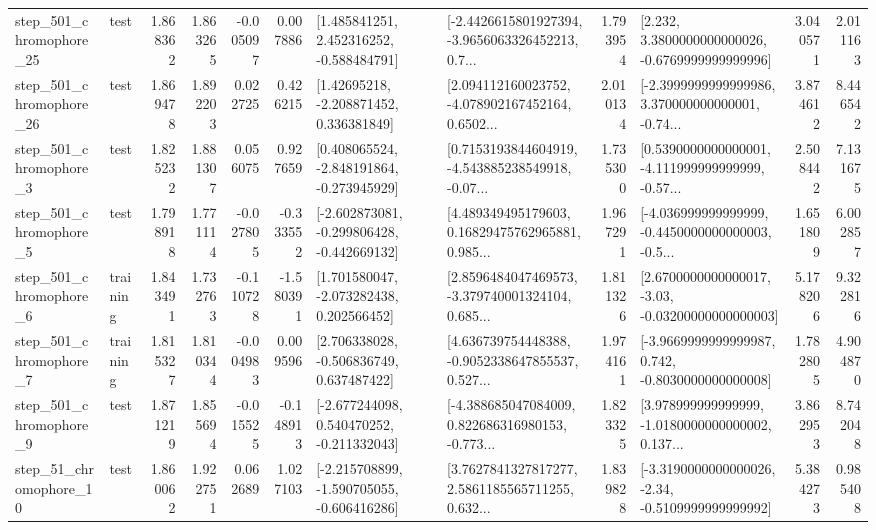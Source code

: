 \begin{tabular}{llrrrrllrlrr}
  step\_501\_chromophore\_25 &      test &      1.868362 &    1.863265 &     -0.005097 &  0.007886 &    [1.485841251, 2.452316252, -0.588484791] &  [-2.4426615801927394, -3.9656063326452213, 0.7... &       1.793954 &   [2.232, 3.3800000000000026, -0.6769999999999996] &            3.040571 &          2.011163 \\
  step\_501\_chromophore\_26 &      test &      1.869478 &    1.892203 &      0.022725 &  0.426215 &     [1.42695218, -2.208871452, 0.336381849] &  [2.094112160023752, -4.078902167452164, 0.6502... &       2.010134 &  [-2.3999999999999986, 3.370000000000001, -0.74... &            3.874612 &          8.446542 \\
   step\_501\_chromophore\_3 &      test &      1.825232 &    1.881307 &      0.056075 &  0.927659 &   [0.408065524, -2.848191864, -0.273945929] &  [0.7153193844604919, -4.543885238549918, -0.07... &       1.735300 &  [0.5390000000000001, -4.111999999999999, -0.57... &            2.508442 &          7.131675 \\
   step\_501\_chromophore\_5 &      test &      1.798918 &    1.771114 &     -0.027805 & -0.333552 &  [-2.602873081, -0.299806428, -0.442669132] &  [4.489349495179603, 0.16829475762965881, 0.985... &       1.967291 &  [-4.036999999999999, -0.4450000000000003, -0.5... &            1.651809 &          6.002857 \\
   step\_501\_chromophore\_6 &  training &      1.843491 &    1.732763 &     -0.110728 & -1.580391 &    [1.701580047, -2.073282438, 0.202566452] &  [2.8596484047469573, -3.379740001324104, 0.685... &       1.811326 &  [2.6700000000000017, -3.03, -0.03200000000000003] &            5.178206 &          9.322816 \\
   step\_501\_chromophore\_7 &  training &      1.815327 &    1.810344 &     -0.004983 &  0.009596 &    [2.706338028, -0.506836749, 0.637487422] &  [4.636739754448388, -0.9052338647855537, 0.527... &       1.974161 &  [-3.9669999999999987, 0.742, -0.8030000000000008] &            1.782805 &          4.904870 \\
   step\_501\_chromophore\_9 &      test &      1.871219 &    1.855694 &     -0.015525 & -0.148913 &   [-2.677244098, 0.540470252, -0.211332043] &  [-4.388685047084009, 0.822686316980153, -0.773... &       1.823325 &  [3.978999999999999, -1.0180000000000002, 0.137... &            3.862953 &          8.742048 \\
   step\_51\_chromophore\_10 &      test &      1.860062 &    1.922751 &      0.062689 &  1.027103 &  [-2.215708899, -1.590705055, -0.606416286] &  [3.7627841327817277, 2.5861185565711255, 0.632... &       1.839828 &  [-3.3190000000000026, -2.34, -0.5109999999999992] &            5.384273 &          0.985408 \\

\end{tabular}
